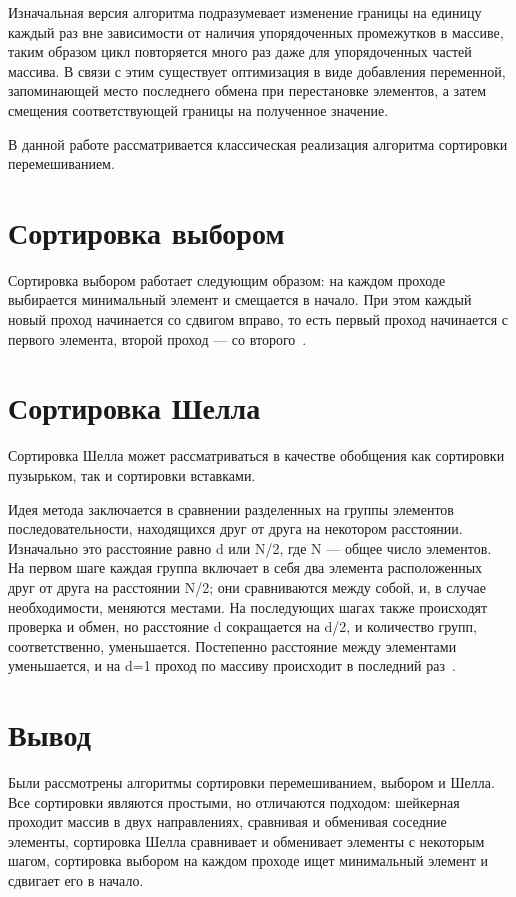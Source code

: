 \documentclass[12pt]{report}
\begin{document}
    Изначальная версия алгоритма подразумевает изменение границы на единицу каждый раз
    вне зависимости от наличия упорядоченных промежутков в массиве,
    таким образом цикл повторяется много раз даже для упорядоченных частей массива.
    В связи с этим существует оптимизация в виде добавления переменной,
    запоминающей место последнего обмена при перестановке элементов,
    а затем смещения соответствующей границы на полученное значение.

    В данной работе рассматривается классическая реализация алгоритма сортировки перемешиванием.


    \section{Сортировка выбором}
    Сортировка выбором работает следующим образом:
    на каждом проходе выбирается минимальный элемент и смещается в начало.
    При этом каждый новый проход начинается со сдвигом вправо,
    то есть первый проход начинается с первого элемента, второй проход — со второго~\cite{Selection}.


    \section{Сортировка Шелла}
    Сортировка Шелла может рассматриваться в качестве обобщения как сортировки пузырьком, так и сортировки вставками.

    Идея метода заключается в сравнении разделенных на группы элементов последовательности,
    находящихся друг от друга на некотором расстоянии.
    Изначально это расстояние равно d или N/2, где N — общее число элементов.
    На первом шаге каждая группа включает в себя два элемента расположенных друг от друга на расстоянии N/2;
    они сравниваются между собой, и, в случае необходимости, меняются местами.
    На последующих шагах также происходят проверка и обмен, но расстояние d сокращается на d/2,
    и количество групп, соответственно, уменьшается. Постепенно расстояние между элементами уменьшается,
    и на d=1 проход по массиву происходит в последний раз~\cite{Shell}.


    \section{Вывод}
    Были рассмотрены алгоритмы сортировки перемешиванием, выбором и Шелла.
    Все сортировки являются простыми, но отличаются подходом: шейкерная проходит массив в двух направлениях,
    сравнивая и обменивая соседние элементы, сортировка Шелла сравнивает и обменивает элементы с некоторым шагом,
    сортировка выбором на каждом проходе ищет минимальный элемент и сдвигает его в начало.
\end{document}
